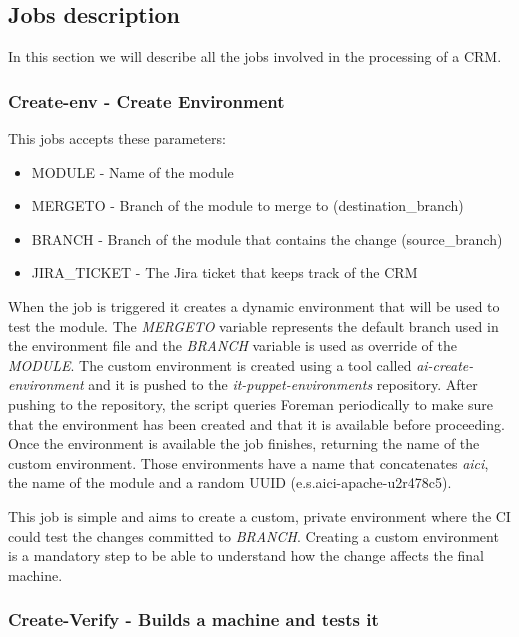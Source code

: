 \subsection{Jobs description}

In this section we will describe all the jobs involved in the processing of
a CRM.

\subsubsection{Create-env - Create Environment}

This jobs accepts these parameters:

\begin{itemize}
  \item MODULE - Name of the module
  \item MERGETO - Branch of the module to merge to (destination\_branch)
  \item BRANCH - Branch of the module that contains the change (source\_branch)
  \item JIRA\_TICKET - The Jira ticket that keeps track of the CRM
\end{itemize}

When the job is triggered it creates a dynamic environment that will be
used to test the module. The \textit{MERGETO} variable represents the
default branch used in the environment file and the \textit{BRANCH}
variable is used as override of the \textit{MODULE}. The custom
environment is created using a tool called \textit{ai-create-environment}
and it is pushed to the \textit{it-puppet-environments} repository. After
pushing to the repository, the script queries Foreman periodically to make
sure that the environment has been created and that it is available before
proceeding. Once the environment is available the job finishes, returning
the name of the custom environment. Those environments have a name that
concatenates \textit{aici}, the name of the module and a random UUID
(e.s.aici-apache-u2r478c5).

This job is simple and aims to create a custom, private environment where
the CI could test the changes committed to \textit{BRANCH}. Creating
a custom environment is a mandatory step to be able to understand how the
change affects the final machine.

\subsubsection{Create-Verify - Builds a machine and tests it}

